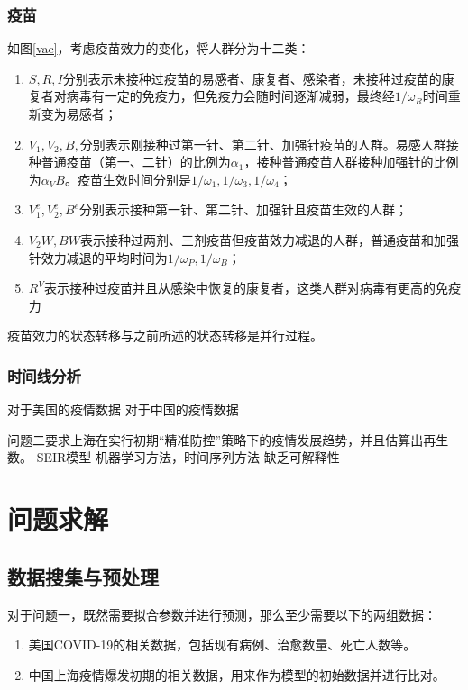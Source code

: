 \documentclass[bwprint]{gmcmthesis}
\numberwithin{figure}{section}
\begin{document}
\subsubsection{疫苗}
\par 如图\ref{vac}，考虑疫苗效力的变化，将人群分为十二类：
\begin{enumerate}
\item $S,R,I$分别表示未接种过疫苗的易感者、康复者、感染者，未接种过疫苗的康复者对病毒有一定的免疫力，但免疫力会随时间逐渐减弱，最终经$1/\omega_R$时间重新变为易感者；
\item $V_1,V_2,B,$分别表示刚接种过第一针、第二针、加强针疫苗的人群。易感人群接种普通疫苗（第一、二针）的比例为$\alpha _{1}$，接种普通疫苗人群接种加强针的比例为$\alpha_VB$。疫苗生效时间分别是$1/\omega_1,1/\omega_3,1/\omega_4$；
\item $V_1^e,V_2^e,B^e$分别表示接种第一针、第二针、加强针且疫苗生效的人群；
\item $V_2W,BW$表示接种过两剂、三剂疫苗但疫苗效力减退的人群，普通疫苗和加强针效力减退的平均时间为$1/\omega_P,1/\omega_B$；
\item $R^V$表示接种过疫苗并且从感染中恢复的康复者，这类人群对病毒有更高的免疫力
\end{enumerate}
\par 疫苗效力的状态转移与之前所述的状态转移是并行过程。
\subsubsection{时间线分析}

对于美国的疫情数据
对于中国的疫情数据



问题二要求上海在实行初期“精准防控”策略下的疫情发展趋势，并且估算出再生数。
SEIR模型
机器学习方法，时间序列方法
缺乏可解释性

\section{问题求解}
\subsection{数据搜集与预处理}
\par 对于问题一，既然需要拟合参数并进行预测，那么至少需要以下的两组数据：

\begin{enumerate}
    \item 美国COVID-19的相关数据，包括现有病例、治愈数量、死亡人数等。
    \item 中国上海疫情爆发初期的相关数据，用来作为模型的初始数据并进行比对。
\end{enumerate}
\end{document}
